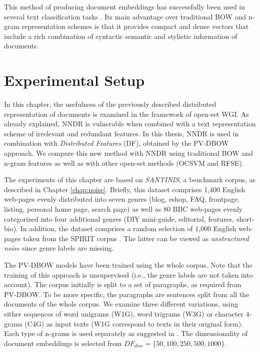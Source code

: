 This method of producing document embeddings has successfully been used in several text classification tasks . Its main advantage over traditional BOW and n-gram representation schemes is that it provides compact and dense vectors that include a rich combination of syntactic semantic and stylistic information of documents.

\section{Experimental Setup}\label{chap:word_embeddings:sec:experiments_setup}

In this chapter, the usefulness of the previously described distributed representation of documents is examined in the framework of open-set WGI. As already explained, NNDR is vulnerable when combined with a text representation scheme of irrelevant and redundant features. In this thesis, NNDR is used in combination with \textit{Distributed Features} (DF), obtained by the PV-DBOW approach. We compare this new method with NNDR using traditional BOW and n-gram features as well as with other open-set methods (OCSVM and RFSE).


The experiments of this chapter are based on \textit{SANTINIS}, a benchmark corpus, as described in Chapter \ref{chap:noise}. Briefly, this dataset comprises 1,400 English web-pages evenly distributed into seven genres (blog, eshop, FAQ, frontpage, listing, personal home page, search page) as well as 80 BBC web-pages evenly categorized into four additional genres (DIY mini-guide, editorial, features, short-bio). In addition, the dataset comprises a random selection of 1,000 English web-pages taken from the SPIRIT corpus \parencite{joho2004spirit}. The latter can be viewed as \textit{unstructured noise} since genre labels are missing.

The PV-DBOW models have been trained using the whole corpus. Note that the training of this approach is unsupervised (i.e., the genre labels are not taken into account). The corpus initially is split to a set of paragraphs, as required from PV-DBOW. To be more specific, the paragraphs are sentences split from all the documents of the whole corpus. We examine three different variations, using either sequences of word unigrams (W1G), word trigrams (W3G) or character 4-grams (C4G) as input texts (W1G correspond to texts in their original form). Each type of n-grams is used separately as suggested in . The dimensionality of document embeddings is selected from $DF_{dim}=\{50,100,250,500,1000\}$. 

